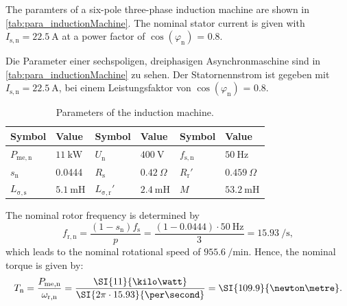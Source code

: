 
The paramters of a six-pole three-phase induction machine are shown in \autoref{tab:para_inductionMachine}. The nominal stator current is given with $I_{\mathrm{s,n}} = \SI{22.5}{\ampere}$ at a power factor of $\cos(\varphi_{\mathrm{n}})$ = 0.8.

\begin{germanblock}
Die Parameter einer sechspoligen, dreiphasigen Asynchronmaschine sind in \autoref{tab:para_inductionMachine} zu sehen. Der Statornennstrom ist gegeben mit $I_{\mathrm{s,n}} = \SI{22,5}{\ampere}$, bei einem Leistungsfaktor von $\cos(\varphi_{\mathrm{n}})$ = 0.8.    
\end{germanblock}

\begin{table}[htb]
    \caption{Parameters of the induction machine.}
    \centering
    \begin{tabular}{llllll}\toprule
    Symbol       & Value    & Symbol    & Value & Symbol    & Value \\
    \midrule
    $P_{\mathrm{me,n}}$    & $\SI{11}{\kilo\watt}$ & $U_{\mathrm{n}}$   & $\SI{400}{\volt}$ &
    $f_{\mathrm{s,n}}$       & $\SI{50}{\hertz}$       \\ $s_{\mathrm{n}}$    & 0.0444 &
    $R_{\mathrm{s}}$       & $\SI{0.42}{\Omega}$    & $R_{\mathrm{r}}'$    & $\SI{0.459}{\Omega}$ \\
    $L_{\mathrm{\sigma,s}}$  & $\SI{5.1}{\milli\henry}$  & $L_{\mathrm{\sigma,r}}'$    & $\SI{2.4}{\milli\henry}$ &
    $M$ & $\SI{53.2}{\milli\henry}$ \\
    \bottomrule
    \end{tabular}
    \label{tab:para_inductionMachine}
\end{table}
\vspace{-1.3em}

\begin{solutionblock}
    The nominal rotor frequency is determined by
    $$ f_{\mathrm{r,n}} = \frac{(1-s_{\mathrm{n}})f_{\mathrm{s}}}{p} = \frac{(1-0.0444)\cdot\SI{50}{\hertz}}{3} = \SI{15.93}{\per\second},$$
    which leads to the nominal rotational speed of $\SI{955.6}{\per\minute}$. Hence, the nominal torque is given by:
    $$ T_{\mathrm{n}} = \frac{P_{\mathrm{me,n}}}{\omega_{\mathrm{r,n}}} = \frac{\SI{11}{\kilo\watt}}{\SI{2\pi\cdot 15.93}{\per\second}} = \SI{109.9}{\newton\metre}.$$
    
\end{solutionblock}


